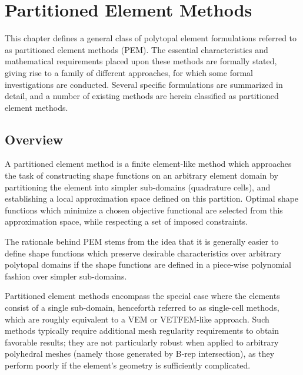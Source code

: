 \chapter{Partitioned Element Methods} \label{ch:pem}
%
This chapter defines a general class of polytopal element formulations referred to as partitioned element methods (PEM). The essential characteristics and mathematical requirements placed upon these methods are formally stated, giving rise to a family of different approaches, for which some formal investigations are conducted. Several specific formulations are summarized in detail, and a number of existing methods are herein classified as partitioned element methods.

\section{Overview}


A partitioned element method is a finite element-like method which approaches the task of constructing shape functions on an arbitrary element domain by partitioning the element into simpler sub-domains (quadrature cells), and establishing a local approximation space defined on this partition. Optimal shape functions which minimize a chosen objective functional are selected from this approximation space, while respecting a set of imposed constraints.

The rationale behind PEM stems from the idea that it is generally easier to define shape functions which preserve desirable characteristics over arbitrary polytopal domains if the shape functions are defined in a piece-wise polynomial fashion over simpler sub-domains.

Partitioned element methods encompass the special case where the elements consist of a single sub-domain, henceforth referred to as single-cell methods, which are roughly equivalent to a VEM or VETFEM-like approach. Such methods typically require additional mesh regularity requirements to obtain favorable results; they are not particularly robust when applied to arbitrary polyhedral meshes (namely those generated by B-rep intersection), as they perform poorly if the element's geometry is sufficiently complicated.

